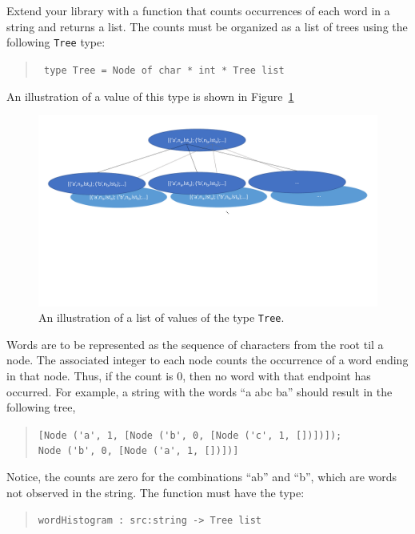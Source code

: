 \label{wordHistogram}
Extend your library with a function that counts occurrences of each
word in a string and returns a list. The counts must be organized as a
list of trees using the following \lstinline{Tree} type:
\begin{quote}
  \mbox{\lstinline! type Tree = Node of char * int * Tree list!}
\end{quote}
An illustration of a value of this type is shown in Figure~\ref{fig:treeType}
\begin{figure}[h!]
  \centering
  \includegraphics[width=\textwidth]{treeType}
  \caption{An illustration of a list of values of the type \lstinline{Tree}.}
  \label{fig:treeType}
\end{figure}
Words are to be represented as the sequence of characters from the
root til a node. The associated integer to each node counts the
occurrence of a word ending in that node. Thus, if the count is 0, then
no word with that endpoint has occurred. For example, a string with the
words ``a abc ba'' should result in the following tree,
\begin{quote}
  \mbox{\lstinline![Node ('a', 1, [Node ('b', 0, [Node ('c', 1, [])])]);!}\\
  \mbox{\hspace{0.5em}\lstinline!Node ('b', 0, [Node ('a', 1, [])])]!}
\end{quote}
Notice, the counts are zero for the combinations ``ab'' and ``b'',
which are words not observed in the string. The function must have the type:
\begin{quote}
  \mbox{\lstinline!wordHistogram : src:string -> Tree list!}
\end{quote}
